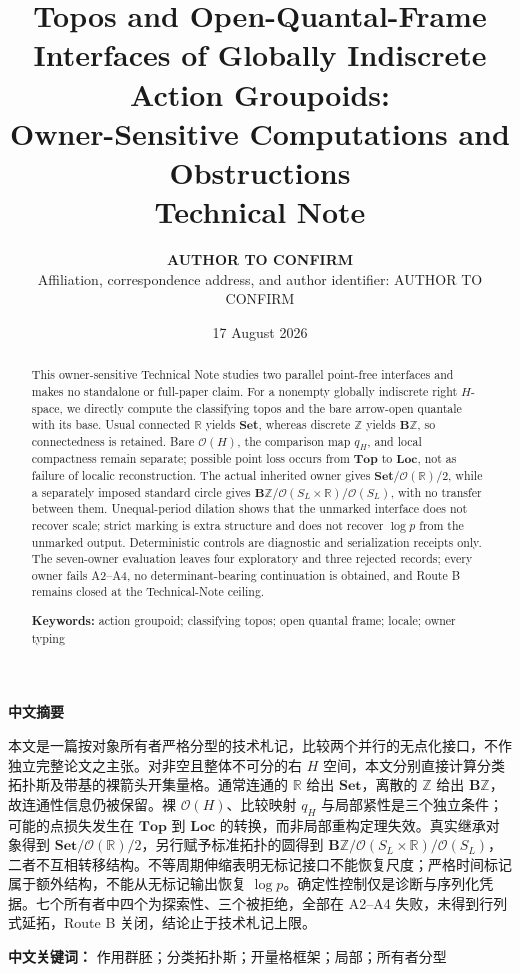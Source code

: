 \documentclass[12pt]{article}
\title{\textbf{Topos and Open-Quantal-Frame Interfaces of Globally Indiscrete Action Groupoids:\\Owner-Sensitive Computations and Obstructions}\\[0.5em]
\large Technical Note}
\author{\textbf{AUTHOR TO CONFIRM}\\
\small Affiliation, correspondence address, and author identifier: AUTHOR TO CONFIRM}
\date{17 August 2026}
\theoremstyle{definition}
\newcommand{\B}{\mathbf B}
\newcommand{\Ocal}{\mathcal O}
\newcommand{\R}{\mathbb R}
\newcommand{\Z}{\mathbb Z}
\newcommand{\Set}{\mathbf{Set}}
\newcommand{\Loc}{\mathbf{Loc}}
\newcommand{\Top}{\mathbf{Top}}
\begin{document}
\maketitle

\begin{abstract}
This owner-sensitive Technical Note studies two parallel point-free interfaces and makes no standalone or full-paper claim.  For a nonempty globally indiscrete right $H$-space, we directly compute the classifying topos and the bare arrow-open quantale with its base.  Usual connected $\R$ yields $\Set$, whereas discrete $\Z$ yields $\B\Z$, so connectedness is retained.  Bare $\Ocal(H)$, the comparison map $q_H$, and local compactness remain separate; possible point loss occurs from $\Top$ to $\Loc$, not as failure of localic reconstruction.  The actual inherited owner gives $\Set/\Ocal(\R)/2$, while a separately imposed standard circle gives $\B\Z/\Ocal(S_L\times\R)/\Ocal(S_L)$, with no transfer between them.  Unequal-period dilation shows that the unmarked interface does not recover scale; strict marking is extra structure and does not recover $\log p$ from the unmarked output.  Deterministic controls are diagnostic and serialization receipts only.  The seven-owner evaluation leaves four exploratory and three rejected records; every owner fails A2--A4, no determinant-bearing continuation is obtained, and Route B remains closed at the Technical-Note ceiling.

\medskip
\noindent\textbf{Keywords:} action groupoid; classifying topos; open quantal frame; locale; owner typing
\end{abstract}

\begin{center}
\textbf{中文摘要}
\end{center}
本文是一篇按对象所有者严格分型的技术札记，比较两个并行的无点化接口，不作独立完整论文之主张。对非空且整体不可分的右 $H$ 空间，本文分别直接计算分类拓扑斯及带基的裸箭头开集量格。通常连通的 $\R$ 给出 $\Set$，离散的 $\Z$ 给出 $\B\Z$，故连通性信息仍被保留。裸 $\Ocal(H)$、比较映射 $q_H$ 与局部紧性是三个独立条件；可能的点损失发生在 $\Top$ 到 $\Loc$ 的转换，而非局部重构定理失效。真实继承对象得到 $\Set/\Ocal(\R)/2$，另行赋予标准拓扑的圆得到 $\B\Z/\Ocal(S_L\times\R)/\Ocal(S_L)$，二者不互相转移结构。不等周期伸缩表明无标记接口不能恢复尺度；严格时间标记属于额外结构，不能从无标记输出恢复 $\log p$。确定性控制仅是诊断与序列化凭据。七个所有者中四个为探索性、三个被拒绝，全部在 A2--A4 失败，未得到行列式延拓，Route B 关闭，结论止于技术札记上限。

\medskip
\noindent\textbf{中文关键词：} 作用群胚；分类拓扑斯；开量格框架；局部；所有者分型
\end{document}
